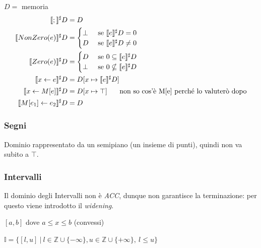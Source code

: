 \documentclass[a4paper, 11pt]{report}
\begin{document}
$D =$ memoria
\begin{align*}
\llbracket ; \rrbracket^\sharp D &= D\\
\llbracket NonZero(e) \rrbracket^\sharp D &=
\begin{cases}
\bot &\text{ se } \llbracket e\rrbracket^\sharp D = 0 \\
D &\text{ se } \llbracket e\rrbracket^\sharp D \neq 0
\end{cases}\\
\llbracket Zero(e) \rrbracket^\sharp D &=
\begin{cases}
D &\text{ se } 0\subseteq \llbracket e\rrbracket^\sharp D \\
\bot &\text{ se } 0\nsubseteq \llbracket e\rrbracket^\sharp D
\end{cases}\\
\llbracket x\leftarrow e \rrbracket^\sharp D &= D[x\mapsto \llbracket e\rrbracket^\sharp D]\\
\llbracket x\leftarrow M[e] \rrbracket^\sharp D &= D[x\mapsto \top] \text{\hspace{0.5cm} non so cos'è M[e] perché lo valuterò dopo}\\
\llbracket M[e_1]\leftarrow e_2 \rrbracket^\sharp D &= D
\end{align*}

\subsubsection*{Segni}
Dominio rappresentato da un semipiano (un insieme di punti), quindi non va subito a $\top$.

\newpage
\subsubsection*{Intervalli}
Il dominio degli Intervalli non è \textit{ACC}, dunque non garantisce la terminazione: per questo viene introdotto il \textit{widening}.

\begin{center}
$[a, b]$ dove $a\leq x\leq b$ (convessi)

$\mathbb{I} = \{[l, u] ~|~ l\in \mathbb{Z}\cup \{-\infty\}, u\in\mathbb{Z}\cup \{+\infty\}, ~l\leq u\}$
\end{center}
\end{document}
